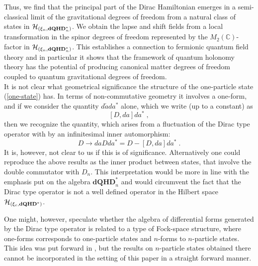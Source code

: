 \documentclass[12pt]{article}
\def\ch{{\cal H}}
\begin{document}
Thus, we find that the principal part of the Dirac Hamiltonian emerges in a semi-classical limit of the gravitational degrees of freedom from a natural class of states in $\ch_{(\xi_n,\mathbf{dQHD}^*_n)}$. We obtain the lapse and shift fields from a local transformation 
 in the spinor degrees of freedom represented by the $M_2(\mathbb{C})$-factor in $\ch_{(\xi_n,\mathbf{dQHD}^*_n)}$.
 This establishes a connection to fermionic quantum field theory and in particular it shows that the framework of quantum holonomy theory has the potential of producing canonical matter degrees of freedom coupled to quantum gravitational degrees of freedom.\\ %
 
 
 
 
 It is not clear what geometrical significance the structure of the one-particle state (\ref{one-state}) has. In terms of non-commutative geometry it involves a one-form, and if we consider the quantity $d\tilde{a} da^*$ alone, which we write (up to a constant) as
 $$
 [D,da] da^*\;,
 $$
then we recognize the quantity, which arises from a fluctuation of the Dirac type operator with by an infinitesimal inner automorphism:
$$
D\rightarrow  da D da^* = D - [D,da]da^*\;.
$$
It is, however, not clear to us if this is of significance. Alternatively one could reproduce the above results as the inner product between states, that involve the double commutator with $D_n$. This interpretation would be more in line with the emphasis put on the algebra $\mathbf{dQHD}^*_n$ and would circumvent the fact that the Dirac type operator is not a well defined operator in the Hilbert space $\ch_{(\xi_c,\mathbf{dQHD}^*)}$.

One might, however, speculate whether the algebra of differential forms generated by the Dirac type operator is related to a type of Fock-space structure, where one-forms corresponds to one-particle states and $n$-forms to $n$-particle states. This idea was put forward in \cite{Aastrup:2011dt}, but the results on $n$-particle states obtained there cannot be incorporated in the setting of this paper in a straight forward manner.\\
\end{document}
